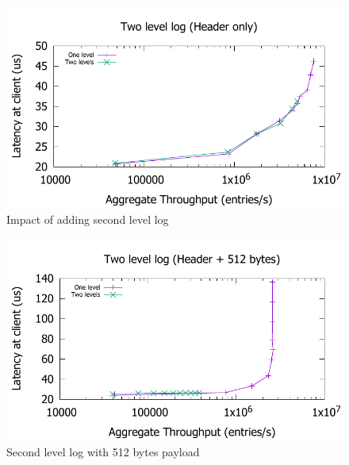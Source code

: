 \documentclass[pageno]{jpaper}
\begin{document}
\begin{figure}
\includegraphics[scale=0.6]{results2/flashlog.pdf}
\caption{Impact of adding second level log}
\label{fig:flashlog}
\end{figure}

\begin{figure}
\includegraphics[scale=0.6]{results2/flashlog_512.pdf}
\caption{Second level log with 512 bytes payload}
\label{fig:flashlog_512}
\end{figure}
\end{document}
